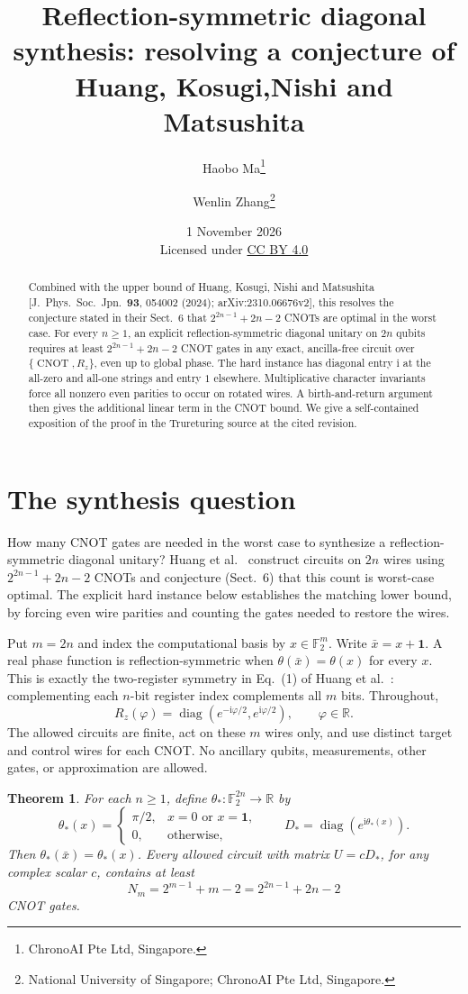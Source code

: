 \documentclass[11pt]{article}
\title{Reflection-symmetric diagonal synthesis:\newline
resolving a conjecture of Huang, Kosugi,\newline Nishi and Matsushita}
\author{Haobo Ma\thanks{ChronoAI Pte Ltd, Singapore.}\and
Wenlin Zhang\thanks{National University of Singapore; ChronoAI Pte Ltd, Singapore.}}
\date{1 November 2026\\[0.4em]
\small Licensed under \href{https://creativecommons.org/licenses/by/4.0/}{CC BY 4.0}}
\newtheorem{theorem}{Theorem}
\newcommand{\F}{\mathbb F_2}
\newcommand{\CNOT}{\operatorname{CNOT}}
\newcommand{\diag}{\operatorname{diag}}
\begin{document}
\maketitle
\begin{abstract}
Combined with the upper bound of Huang, Kosugi, Nishi and Matsushita
[J.\ Phys.\ Soc.\ Jpn.\ \textbf{93}, 054002 (2024);
arXiv:2310.06676v2], this resolves the conjecture stated in their
Sect.~6 that $2^{2n-1}+2n-2$ CNOTs are optimal in the worst case.
For every $n\geq1$, an explicit reflection-symmetric diagonal unitary on
$2n$ qubits requires at least $2^{2n-1}+2n-2$ CNOT gates in any exact,
ancilla-free circuit over $\{\CNOT,R_z\}$, even up to global phase.
The hard instance has diagonal entry $\mathrm i$ at the all-zero and
all-one strings and entry $1$ elsewhere. Multiplicative character
invariants force all nonzero even parities to occur on rotated wires.
A birth-and-return argument then gives the additional linear term in
the CNOT bound. We give a self-contained exposition of the proof in the
Trureturing source at the cited revision.
\end{abstract}

\section{The synthesis question}
How many CNOT gates are needed in the worst case to synthesize a
reflection-symmetric diagonal unitary? Huang et al.~\cite{HKNM}
construct circuits on $2n$ wires using $2^{2n-1}+2n-2$ CNOTs and
conjecture (Sect.~6) that this count is worst-case optimal.
The explicit hard instance below
establishes the matching lower bound, by forcing even wire parities
and counting the gates needed to restore the wires.

Put $m=2n$ and index the computational basis by $x\in\F^m$.
Write $\bar x=x+\mathbf1$. A real phase function is reflection-symmetric
when $\theta(\bar x)=\theta(x)$ for every $x$.
This is exactly the two-register symmetry in Eq.~(1) of
Huang et al.~\cite{HKNM}: complementing each $n$-bit register index
complements all $m$ bits. Throughout,
\[
 R_z(\varphi)=\diag(e^{-\mathrm i\varphi/2},e^{\mathrm i\varphi/2}),
 \qquad \varphi\in\mathbb R.
\]
The allowed circuits are finite, act on these $m$ wires only, and use
distinct target and control wires for each CNOT. No ancillary qubits,
measurements, other gates, or approximation are allowed.

\begin{theorem}\label{thm:main}
For each $n\geq1$, define $\theta_*:\F^{2n}\to\mathbb R$ by
\[
 \theta_*(x)=
 \begin{cases}\pi/2,&x=0\text{ or }x=\mathbf1,\\0,&\text{otherwise},\end{cases}
 \qquad D_*=\diag(e^{\mathrm i\theta_*(x)}).
\]
Then $\theta_*(\bar x)=\theta_*(x)$. Every allowed circuit with matrix
$U=cD_*$, for any complex scalar $c$, contains at least
\[
 N_m=2^{m-1}+m-2=2^{2n-1}+2n-2
\]
CNOT gates.
\end{theorem}
\end{document}
